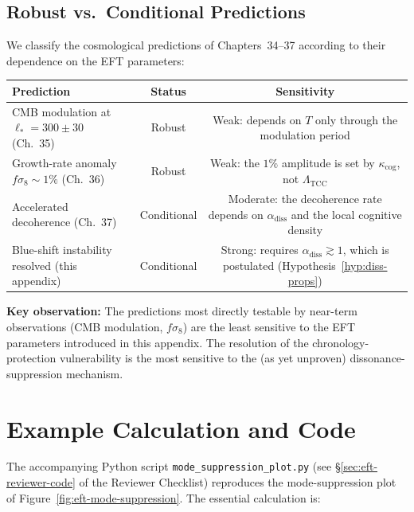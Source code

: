 \documentclass[12pt,openany]{book}
\theoremstyle{plain}
\theoremstyle{definition}
\theoremstyle{remark}
\providecommand{\Ltcc}{\Lambda_{\mathrm{TCC}}}
\providecommand{\kcog}{\kappa_{\mathrm{cog}}}
\providecommand{\diss}{\mathrm{diss}}
\begin{document}
\subsection{Robust vs.\ Conditional Predictions}
\label{sec:eft-robust}

We classify the cosmological predictions of Chapters~34--37 according
to their dependence on the EFT parameters:

\begin{center}
\renewcommand{\arraystretch}{1.3}
\begin{tabular}{p{5cm}cc}
\hline
\textbf{Prediction} & \textbf{Status} & \textbf{Sensitivity} \\
\hline
CMB modulation at $\ell_{*} = 300 \pm 30$ (Ch.~35)
  & Robust & Weak: depends on $T$ only through the modulation period \\
Growth-rate anomaly $f\sigma_{8} \sim 1\%$ (Ch.~36)
  & Robust & Weak: the $1\%$ amplitude is set by $\kcog$, not $\Ltcc$ \\
Accelerated decoherence (Ch.~37)
  & Conditional & Moderate: the decoherence rate depends on $\alpha_{\diss}$
    and the local cognitive density \\
Blue-shift instability resolved (this appendix)
  & Conditional & Strong: requires $\alpha_{\diss} \gtrsim 1$,
    which is postulated (Hypothesis~\ref{hyp:diss-props}) \\
\hline
\end{tabular}
\end{center}

\medskip
\noindent
\textbf{Key observation:} The predictions most directly testable by
near-term observations (CMB modulation, $f\sigma_{8}$) are the least
sensitive to the EFT parameters introduced in this appendix.  The
resolution of the chronology-protection vulnerability is the most
sensitive to the (as yet unproven) dissonance-suppression mechanism.


\section{Example Calculation and Code}
\label{sec:eft-code}

The accompanying Python script \texttt{mode\_suppression\_plot.py}
(see \S\ref{sec:eft-reviewer-code} of the Reviewer Checklist)
reproduces the mode-suppression plot of
Figure~\ref{fig:eft-mode-suppression}.  The essential calculation is:
\end{document}
